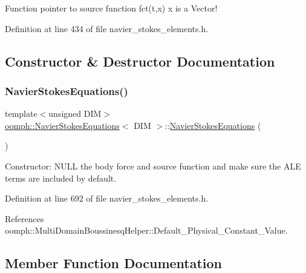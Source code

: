 Function pointer to source function fct(t,x) x is a Vector! 



Definition at line 434 of file navier\+\_\+stokes\+\_\+elements.\+h.



\subsection{Constructor \& Destructor Documentation}
\mbox{\label{classoomph_1_1NavierStokesEquations_aee170363c7d480caddfec01a9f785ef4}} 
\subsubsection{\texorpdfstring{Navier\+Stokes\+Equations()}{NavierStokesEquations()}}
{\footnotesize\ttfamily template$<$unsigned D\+IM$>$ \\
\hyperlink{classoomph_1_1NavierStokesEquations}{oomph\+::\+Navier\+Stokes\+Equations}$<$ D\+IM $>$\+::\hyperlink{classoomph_1_1NavierStokesEquations}{Navier\+Stokes\+Equations} (\begin{DoxyParamCaption}{ }\end{DoxyParamCaption})\hspace{0.3cm}{\ttfamily [inline]}}



Constructor\+: N\+U\+LL the body force and source function and make sure the A\+LE terms are included by default. 



Definition at line 692 of file navier\+\_\+stokes\+\_\+elements.\+h.



References oomph\+::\+Multi\+Domain\+Boussinesq\+Helper\+::\+Default\+\_\+\+Physical\+\_\+\+Constant\+\_\+\+Value.



\subsection{Member Function Documentation}
\mbox{\label{classoomph_1_1NavierStokesEquations_a944d3c1539a3f1d0f272bda993f91c3a}} 
